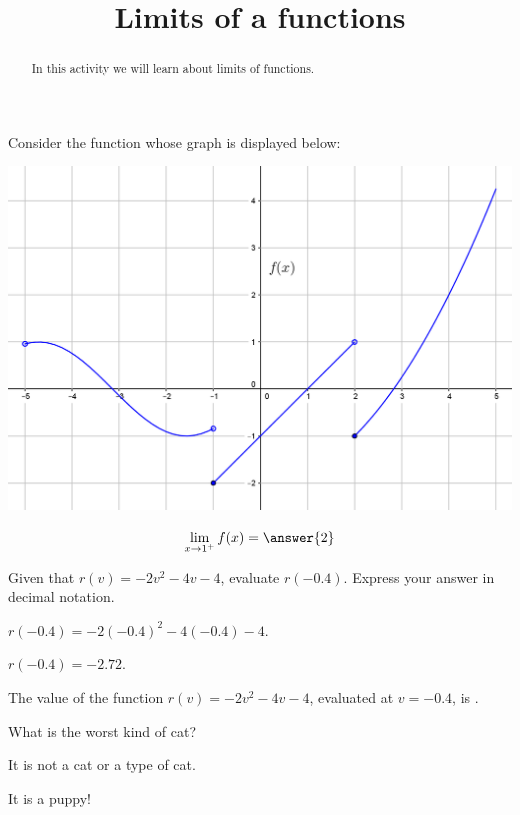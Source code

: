 \documentclass{ximera}
\title{Limits of a functions}
\begin{document}
\begin{abstract}
In this activity we will learn about limits of functions.
\end{abstract}
\maketitle

Consider the function whose graph is displayed below:

\begin{image}
\includegraphics{pieceWise1.png}
\end{image}

\begin{exercise}
\[\lim_{x \to 1^+} f(x)=\answer{2}\]
\end{exercise}


\begin{exercise}
Given that $r(v)=-2 v^2-4 v-4$, evaluate $r(-0.4)$. Express your answer in decimal notation.
\begin{hint}
$r(-0.4)=-2 (-0.4)^2-4 (-0.4)-4$.
\end{hint}
\begin{hint}
$r(-0.4)=-2.72$.
\end{hint}

The value of the function $r(v)=-2 v^2-4 v-4$, evaluated at $v=-0.4$, is .
\end{exercise}



\begin{question}
What is the worst kind of cat?
\begin{prompt}
\begin{multipleChoice}
\end{multipleChoice}
\end{prompt}
\begin{hint}
It is not a cat or a type of cat.
\end{hint}
\begin{hint}
It is a puppy!
\end{hint}
\end{question}
\end{document}
